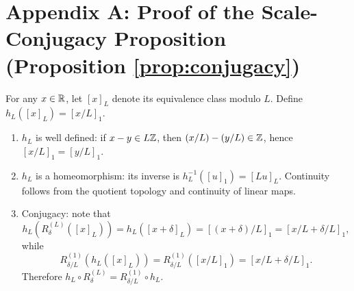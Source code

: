 ﻿\section{Appendix A: Proof of the Scale-Conjugacy Proposition (Proposition \ref{prop:conjugacy})}

For any $x\in\mathbb{R}$, let $[x]_L$ denote its equivalence class modulo $L$. Define $h_L([x]_L)=[x/L]_1$.
\begin{enumerate}
  \item $h_L$ is well defined: if $x-y\in L\mathbb{Z}$, then $(x/L)-(y/L)\in\mathbb{Z}$, hence $[x/L]_1=[y/L]_1$.
  \item $h_L$ is a homeomorphism: its inverse is $h_L^{-1}([u]_1)=[Lu]_L$. Continuity follows from the quotient topology and continuity of linear maps.
  \item Conjugacy: note that
  \[
  h_L(R_\delta^{(L)}([x]_L))=h_L([x+\delta]_L)=[(x+\delta)/L]_1=[x/L+\delta/L]_1,
  \]
  while
  \[
  R_{\delta/L}^{(1)}(h_L([x]_L))=R_{\delta/L}^{(1)}([x/L]_1)=[x/L+\delta/L]_1.
  \]
  Therefore $h_L\circ R_\delta^{(L)}=R_{\delta/L}^{(1)}\circ h_L$.
\end{enumerate}
